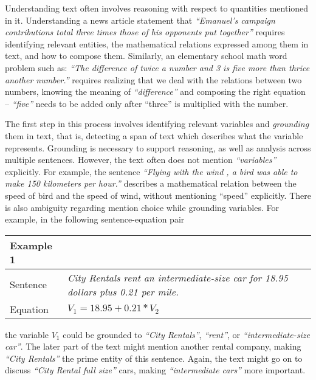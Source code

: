   Understanding text often involves reasoning with respect to
  quantities mentioned in it. Understanding a news article statement
  that {\em``Emanuel's campaign contributions total three times those
  of his opponents put together''} requires identifying relevant
  entities, the mathematical relations expressed among them in text,
  and how to compose them. Similarly, an elementary school math word
  problem such as: {\em``The difference of twice a number and 3 is
  five more than thrice another number.''} requires realizing that we
  deal with the relations between two numbers, knowing the meaning of
  {\em``difference''} and composing the right equation --
  {\em``five''} needs to be added only after “three” is multiplied
  with the number.

  The first step in this process involves identifying relevant
  variables and {\em grounding} them in text, that is, detecting a
  span of text which describes what the variable represents. Grounding
  is necessary to support reasoning, as well as analysis across
  multiple sentences. However, the text often does not mention
  {\em``variables''} explicitly. For example, the sentence
  {\em``Flying with the wind , a bird was able to make 150 kilometers
  per hour.''}  describes a mathematical relation between the speed of
  bird and the speed of wind, without mentioning ``speed''
  explicitly. There is also ambiguity regarding mention choice while
  grounding variables. For example, in the following sentence-equation
  pair

  \setlength{\tabcolsep}{6pt}
  \begin{table}[H]
   \centering \small
   \begin{tabular}{|lp{5cm}|}
     \hline Example 1 &  \\
     \hline Sentence & {\em City Rentals rent an intermediate-size car
  for 18.95 dollars plus 0.21 per mile.} \\
     \hline Equation & $V_1=18.95+0.21*V_2$ \\
     \hline 
   \end{tabular}
   \label{tab:example1}
  \end{table}
  
  \noindent the variable $V_1$ could be grounded to {\em``City
  Rentals''}, {\em``rent''}, or {\em``intermediate-size car''}. The
  later part of the text might mention another rental company, making
  {\em``City Rentals''} the prime entity of this sentence. Again, the
  text might go on to discuss {\em``City Rental full size''} cars,
  making {\em``intermediate cars''} more important.
  
